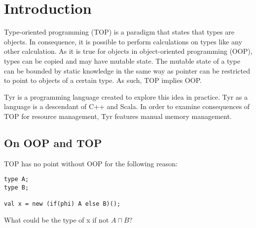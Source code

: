 
\section{Introduction}

Type-oriented programming (TOP) is a paradigm that states that types are objects.
In consequence, it is possible to perform calculations on types like any other calculation.
As it is true for objects in object-oriented programming (OOP), types can be copied and may have mutable state.
The mutable state of a type can be bounded by static knowledge in the same way as pointer can be restricted to point to objects of a certain type.
As such, TOP implies OOP.

Tyr is a programming language created to explore this idea in practice.
Tyr as a language is a descendant of C++ and Scala.
In order to examine consequences of TOP for resource management, Tyr features manual memory management.


\subsection{On OOP and TOP}

TOP has no point without OOP for the following reason:

\begin{lstlisting}
type A;
type B;

val x = new (if(phi) A else B)();
\end{lstlisting}

What could be the type of x if not $A \sqcap B$?